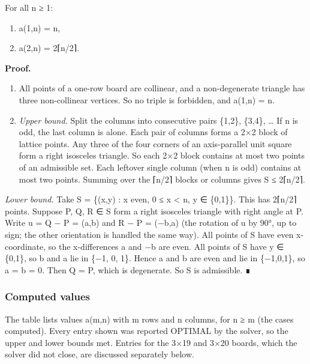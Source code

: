 \documentclass[
  11pt,
]{article}
\providecommand{\tightlist}{%
  \setlength{\itemsep}{0pt}\setlength{\parskip}{0pt}}
\begin{document}
For all n ≥ 1:

\begin{enumerate}
\def\labelenumi{(\roman{enumi})}
\tightlist
\item
  a(1,n) = n,
\item
  a(2,n) = 2⌈n/2⌉.
\end{enumerate}

\textbf{Proof.}

\begin{enumerate}
\def\labelenumi{(\roman{enumi})}
\item
  All points of a one-row board are collinear, and a non-degenerate
  triangle has three non-collinear vertices. So no triple is forbidden,
  and a(1,n) = n.
\item
  \emph{Upper bound.} Split the columns into consecutive pairs \{1,2\},
  \{3,4\}, \ldots{} If n is odd, the last column is alone. Each pair of
  columns forms a 2×2 block of lattice points. Any three of the four
  corners of an axis-parallel unit square form a right isosceles
  triangle. So each 2×2 block contains at most two points of an
  admissible set. Each leftover single column (when n is odd) contains
  at most two points. Summing over the ⌈n/2⌉ blocks or columns gives
  \textbar S\textbar{} ≤ 2⌈n/2⌉.
\end{enumerate}

\emph{Lower bound.} Take S = \{(x,y) : x even, 0 ≤ x \textless{} n, y ∈
\{0,1\}\}. This has 2⌈n/2⌉ points. Suppose P, Q, R ∈ S form a right
isosceles triangle with right angle at P. Write u = Q − P = (a,b) and R
− P = (−b,a) (the rotation of u by 90°, up to sign; the other
orientation is handled the same way). All points of S have even
x-coordinate, so the x-differences a and −b are even. All points of S
have y ∈ \{0,1\}, so b and a lie in \{−1, 0, 1\}. Hence a and b are even
and lie in \{−1,0,1\}, so a = b = 0. Then Q = P, which is degenerate. So
S is admissible. ∎

\subsubsection{Computed values}\label{computed-values}

The table lists values a(m,n) with m rows and n columns, for n ≥ m (the
cases computed). Every entry shown was reported OPTIMAL by the solver,
so the upper and lower bounds met. Entries for the 3×19 and 3×20 boards,
which the solver did not close, are discussed separately below.
\end{document}
